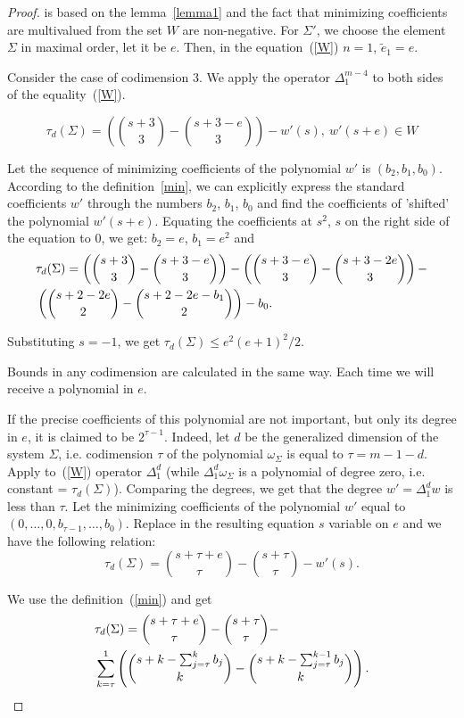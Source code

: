 \documentclass[a4paper,reqno,12pt]{amsart}
\theoremstyle{plain}
\theoremstyle{remark}
\theoremstyle{definition}
\renewcommand{\le}{\leqslant}
\begin{document}
\begin{proof}
is 
based on the lemma~\ref{lemma1} and the fact that minimizing 
coefficients are multivalued from the set $W$ are non-negative.
For $\Sigma'$, we choose the element $\Sigma$ in maximal order,
let it be $e$. Then, in the equation~(\ref{W}) $n = 1$, 
$\tilde e_1 = e $.
 
  
Consider the case of codimension 3.
We apply the operator $\Delta_1^{m-4}$ to both 
sides of the equality~(\ref{W}).

$$
\tau_d(\Sigma)=
\left(
\binom{s+3}{3}-\binom{s+3-e}{3}\right)
 -w'(s),\ w'(s+e)\in W
$$

Let the sequence of minimizing coefficients of the polynomial $w'$
is $(b_2, b_1, b_0)$. According to the definition~\ref{min}, we can 
explicitly express the standard coefficients
$w'$ through the numbers $b_2$, $b_1$, $b_0$ and find the coefficients 
of 'shifted'
the polynomial $w'(s + e)$.
Equating the coefficients at $s^2$, $s$
on the right side of the equation to 0, we get:
$b_2 = e$, $b_1 =e^2$ and
\begin{align}
&
\tau_d(\Sigma)=
\left(\binom{s+3}{3}-\binom{s+3-e}{3}\right) -
\left(\binom{s+3-e}{3}-\binom{s+3-2e}{3}\right) -  \notag  \\
&
\left(\binom{s+2-2e}{2}-\binom{s+2-2e-b_1}{2}\right) - b_0.  \notag
\end{align}

Substituting $s=-1$, we get $\tau_d(\Sigma) \le e^2 (e + 1)^2/2 $.

Bounds in any codimension are calculated in the same way.
Each time we will receive a polynomial in $e$.

If the precise coefficients of this polynomial are not important, 
but only its degree in $e$,
it is claimed to be $2^{\tau-1} $. Indeed,
let $d$ be the generalized dimension of the system $\Sigma$, i.e.
codimension $\tau$ of
the polynomial $\omega_\Sigma $ is equal to $\tau = m-1-d$.
Apply to~(\ref{W}) operator
$\Delta_1^{d}$ (while
$\Delta_1^{d}\omega_\Sigma$ is a polynomial of degree zero,
i.e.  constant = $\tau_d(\Sigma)$).
Comparing the degrees, we get that the degree $w '=\Delta_1^{d} w $ 
is less than $\tau $.
Let the minimizing coefficients of the polynomial $w '$
equal to $ (0,\dots, 0, b _{\tau-1}, \dots, b_0)$.
Replace in the resulting equation
$s$ variable
on $e$ and we have the following relation:
$$
\tau_d(\Sigma)=\binom{s+\tau+e}{\tau}-\binom{s+\tau}{\tau}-w'(s).
$$

We use the definition~(\ref{min}) and get
\begin{align}\label{fin}
&
\tau_d(\Sigma)=\binom{s+\tau+e}{\tau}-\binom{s+\tau}{\tau}-   \\ 
&
\sum_{k=\tau}^{1}
\left(\binom{s+k-\sum_{j=\tau}^{k}b_j}{k}-
\binom{s+k-\sum_{j=\tau}^{k-1}b_j}{k}\right).  \notag
\end{align}


\end{proof}
\end{document}
